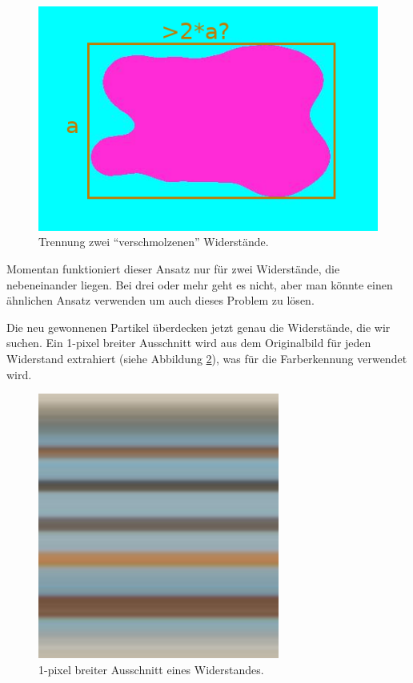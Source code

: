 \begin{figure}[H]
    \centering
    \includegraphics[width=.7\linewidth]{images/7}
    \caption{Trennung zwei ``verschmolzenen'' Widerst\"ande.}
    \label{fig:7}
\end{figure} 

Momentan  funktioniert  dieser  Ansatz  nur   f\"ur  zwei  Widerst\"ande,  die
nebeneinander  liegen. Bei drei oder mehr geht es  nicht,  aber  man  k\"onnte
einen  \"ahnlichen  Ansatz  verwenden  um  auch  dieses  Problem  zu  l\"osen.

Die neu gewonnenen Partikel \"uberdecken  jetzt  genau  die Widerst\"ande, die
wir  suchen.  Ein 1-pixel breiter Ausschnitt wird aus dem  Originalbild  f\"ur
jeden  Widerstand  extrahiert  (siehe  Abbildung  \ref{fig:8}), was f\"ur  die
Farberkennung verwendet wird.

\begin{figure}[H]
    \centering
    \includegraphics[width=.5\linewidth]{images/8}
    \caption{1-pixel breiter Ausschnitt eines Widerstandes.}
    \label{fig:8}
\end{figure}

